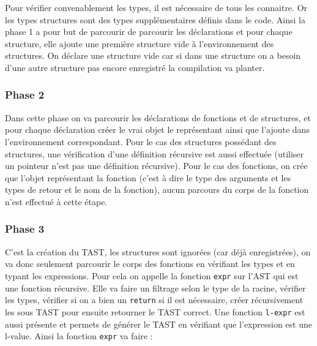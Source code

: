 \documentclass[10pt]{report}
\begin{document}
Pour vérifier convenablement les types, il est nécessaire de tous les connaitre. Or les types structures sont des types supplémentaires définis dans le code. Ainsi la phase 1 a pour but de parcourir de parcourir les déclarations et pour chaque structure, elle ajoute une première structure vide à l'environnement des structures. On déclare une structure vide car si dans une structure on a besoin d'une autre structure pas encore enregistré la compilation va planter.

\subsubsection{Phase 2}

Dans cette phase on va parcourir les déclarations de fonctions et de structures, et pour chaque déclaration créer le vrai objet le représentant ainsi que l'ajoute dans l'environnement correspondant. Pour le cas des structures possédant des structures, une vérification d'une définition récursive est aussi effectuée (utiliser un pointeur n'est pas une définition récursive). Pour le cas des fonctions, on crée que l'objet représentant la fonction (c'est à dire le type des arguments et les types de retour et le nom de la fonction), aucun parcours du corps de la fonction n'est effectué à cette étape.

\subsubsection{Phase 3}

C'est la création du TAST, les structures sont ignorées (car déjà enregistrées), on va donc seulement parcourir le corps des fonctions en vérifiant les types et en typant les expressions. Pour cela on appelle la fonction \verb|expr| sur l'AST qui est une fonction récursive. Elle va faire un filtrage selon le type de la racine, vérifier les types, vérifier si on a bien un \verb|return| si il est nécessaire, créer récursivement les sous TAST pour ensuite retourner le TAST correct. Une fonction \verb|l-expr| est aussi présente et permets de générer le TAST en vérifiant que l'expression est une l-value. Ainsi la fonction \verb|expr| va faire :
\end{document}
